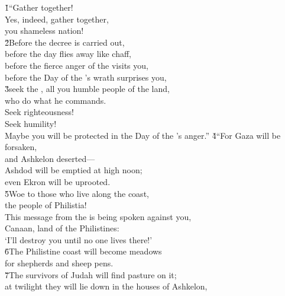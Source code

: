 \begin{poetry}
\poeml {}
\v{1}``Gather together! \\
\poeml Yes, indeed, gather together, \\
\poemlll       you shameless nation! \\
\poeml \v{2}Before the decree is carried out, \\
\poemll    before the day flies away like chaff, \\
\poeml before the fierce anger of the  visits you, \\
\poemll    before the Day of the 's wrath surprises you, \\
\poeml \v{3}seek the , all you humble people of the land, \\
\poemll    who do what he commands. \\
\poeml Seek righteousness! \\
\poemll    Seek humility! \\
\poemlll       Maybe you will be protected in the Day of the 's anger.''
\poeml \v{4}``For Gaza will be forsaken, \\
\poemll    and Ashkelon deserted--- \\
\poeml Ashdod will be emptied at high noon; \\
\poemll    even Ekron will be uprooted. \\
\poeml \v{5}Woe to those who live along the coast, \\
\poemll    the people of Philistia! \\
\poeml This message from the  is being spoken against you, \\
\poemll    Canaan, land of the Philistines: \\
\poemlll       `I'll destroy you until no one lives there!' \\
\poeml \v{6}The Philistine coast will become meadows \\
\poemll    for shepherds and sheep pens. \\
\poeml \v{7}The survivors of Judah will find pasture on it; \\
\poemll    at twilight they will lie down in the houses of Ashkelon, \\

\end{poetry}
